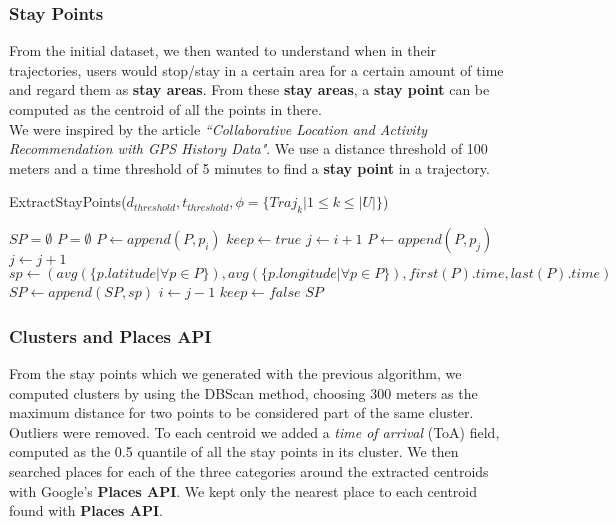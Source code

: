 \documentclass[../../main]{subfiles}
\begin{document}
\subsubsection{Stay Points}
\label{sss:stay-points}
From the initial dataset, we then wanted to understand when in their trajectories, users would stop/stay in a certain area for a certain amount of time and regard them as \textbf{stay areas}.
From these \textbf{stay areas}, a \textbf{stay point} can be computed as the centroid of all the points in there.\\
We were inspired by the article \textit{``Collaborative Location and Activity Recommendation with GPS History Data"}. 
We use a distance threshold of 100 meters and a time threshold of 5 minutes to find a \textbf{stay point} in a trajectory.
\begin{algorithm}
    \caption{ExtractStayPoints($d_{threshold}, t_{threshold}, \phi{}=\{Traj_k | 1 \le{} k \le{} |U|\}$)}
    \begin{algorithmic}
        \STATE $SP = \emptyset$
                \STATE $P = \emptyset$
                \STATE $P \leftarrow{} append(P, p_i)$
                \STATE $keep \leftarrow{} true$
                \STATE $j \leftarrow{} i + 1$
                        \STATE $P \leftarrow{} append(P, p_j)$
                        \STATE $j \leftarrow{} j + 1$
                    \ELSE
                            \STATE $sp \leftarrow{} (avg(\{p.latitude | \forall{} p \in{} P\}), avg(\{p.longitude | \forall{} p \in{} P\}), first(P).time, last(P).time)$
                            \STATE $SP \leftarrow{} append(SP, sp)$
                            \STATE $i \leftarrow{} j - 1$
                        \ENDIF
                        \STATE $keep \leftarrow{} false$
                    \ENDIF
                \ENDWHILE
            \ENDFOR
        \ENDFOR
        \RETURN $SP$
    \end{algorithmic}
\end{algorithm}

\subsubsection{Clusters and Places API}
\label{sss:cluster}
From the stay points which we generated with the previous algorithm, we computed clusters by using the DBScan method, choosing 300 meters as the maximum distance for two points to be considered part of the same cluster.
Outliers were removed.
To each centroid we added a \textit{time of arrival} (ToA) field, computed as the 0.5 quantile of all the stay points in its cluster.
We then searched places for each of the three categories around the extracted centroids with Google's \textbf{Places API}.
We kept only the nearest place to each centroid found with \textbf{Places API}.
\end{document}
